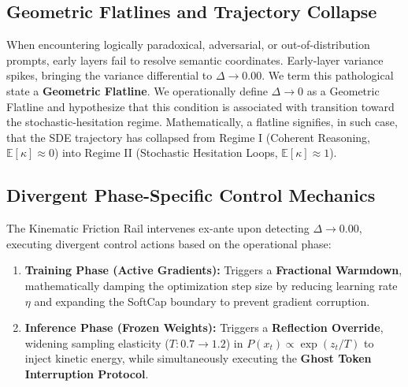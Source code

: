 \documentclass[11pt]{article}
\begin{document}
\subsection{Geometric Flatlines and Trajectory Collapse}
When encountering logically paradoxical, adversarial, or out-of-distribution prompts, early layers fail to resolve semantic coordinates. Early-layer variance spikes, bringing the variance differential to $\Delta \to 0.00$. We term this pathological state a \textbf{Geometric Flatline}.  We operationally define \(\Delta\to0\) as a Geometric Flatline and hypothesize that this condition is associated with transition toward the stochastic-hesitation regime. Mathematically, a flatline signifies, in such case, that the SDE trajectory has collapsed from Regime I (Coherent Reasoning, $\mathbb{E}[\kappa] \approx 0$) into Regime II (Stochastic Hesitation Loops, $\mathbb{E}[\kappa] \approx 1$).

\subsection{Divergent Phase-Specific Control Mechanics}
The Kinematic Friction Rail intervenes ex-ante upon detecting $\Delta \to 0.00$, executing divergent control actions based on the operational phase:
\begin{enumerate}
    \item \textbf{Training Phase (Active Gradients):} Triggers a \textbf{Fractional Warmdown}, mathematically damping the optimization step size by reducing learning rate $\eta$ and expanding the SoftCap boundary to prevent gradient corruption.
    \item \textbf{Inference Phase (Frozen Weights):} Triggers a \textbf{Reflection Override}, widening sampling elasticity ($T: 0.7 \to 1.2$) in $P(x_t) \propto \exp(z_t/T)$ to inject kinetic energy, while simultaneously executing the \textbf{Ghost Token Interruption Protocol}.
\end{enumerate}
\end{document}
